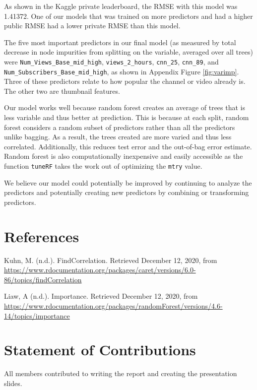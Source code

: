 \documentclass{scrartcl}
\begin{document}
\quad As shown in the Kaggle private leaderboard, the RMSE with this model was 1.41372. One of our models that was trained on more predictors and had a higher public RMSE had a lower private RMSE than this model.

The five most important predictors in our final model (as measured by total decrease in node impurities from splitting on the variable, averaged over all trees) were \verb|Num_Views_Base_mid_high|, \verb|views_2_hours|, \verb|cnn_25|, \verb|cnn_89|, and\\ \verb|Num_Subscribers_Base_mid_high|, as shown in Appendix Figure \ref{fig:varimp}. Three of these predictors relate to how popular the channel or video already is. The other two are thumbnail features.

Our model works well because random forest creates an average of trees that is less variable and thus better at prediction. This is because at each split, random forest considers a random subset of predictors rather than all the predictors unlike bagging. As a result, the trees created are more varied and thus less correlated. Additionally, this reduces test error and the out-of-bag error estimate. Random forest is also computationally inexpensive and easily accessible as the function \verb|tuneRF| takes the work out of optimizing the \verb|mtry| value.

We believe our model could potentially be improved by continuing to analyze the predictors and potentially creating new predictors by combining or transforming predictors.

\pagebreak

\section*{References}


\quad Kuhn, M. (n.d.). FindCorrelation. Retrieved December 12, 2020, from \url{https://www.rdocumentation.org/packages/caret/versions/6.0-86/topics/findCorrelation}

Liaw, A (n.d.). Importance. Retrieved December 12, 2020, from \url{https://www.rdocumentation.org/packages/randomForest/versions/4.6-14/topics/importance}

\section*{Statement of Contributions}

All members contributed to writing the report and creating the presentation slides.
\end{document}
